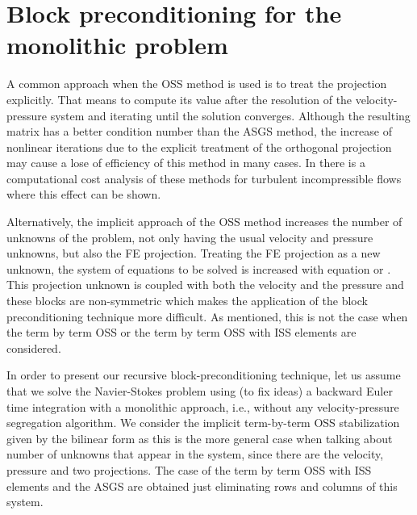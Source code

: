 \section{Block preconditioning for the monolithic problem}
\label{subsec-C5_block_precond}

A common approach when the OSS method is used is to treat the projection explicitly. That means to compute its value after the resolution of the velocity-pressure system and iterating until the solution converges. Although the resulting matrix has a better condition number than the ASGS method, the increase of nonlinear iterations due to the explicit treatment of the orthogonal projection may cause a lose of efficiency of this method in many cases. In \cite{colomes_assessment_2015} there is a computational cost analysis of these methods for turbulent incompressible flows where this effect can be shown.

Alternatively, the implicit approach of the OSS method increases the number of unknowns of the problem, not only having the usual velocity and pressure unknowns, but also the FE projection. Treating the FE projection as a new unknown, the system of equations to be solved is increased with equation  or . This projection unknown is coupled with both the velocity and the pressure and these blocks are non-symmetric which makes the application of the block preconditioning technique more difficult. As mentioned, this is not the case when the term by term OSS or the term by term OSS with ISS elements are considered.



In order to present our recursive block-preconditioning technique, let us assume that we solve the Navier-Stokes problem using (to fix ideas) a backward Euler time integration with a monolithic approach, i.e., without any velocity-pressure segregation algorithm. We consider the implicit term-by-term OSS stabilization given by the bilinear form  as this is the more general case when talking about number of unknowns that appear in the system, since there are the velocity, pressure and two projections. The case of the term by term OSS with ISS elements and the ASGS are obtained just eliminating rows and columns of this system.

